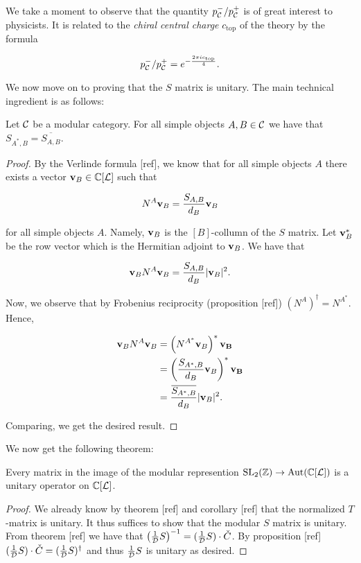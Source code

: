 We take a moment to observe that the quantity $p_{{\mathcal C}}^-/p_{{\mathcal C}}^+$ is of great interest to physicists. It is related to the {\em chiral central charge} $c_{\text{top}}$ of the theory by the formula

$$p_{{\mathcal C}}^-/p_{{\mathcal C}}^{+}=e^{-\frac{2\pi i c_{\text{top}}}{4}}.$$


We now move on to proving that the $S$ matrix is unitary. The main technical ingredient is as follows:

\begin{prop} Let ${\mathcal C}$ be a modular category. For all simple objects $A,B\in {\mathcal C}$ we have that $S_{A^*,B}=\overline{S_{A,B}}$.
\end{prop}
\begin{proof} By the Verlinde formula [ref], we know that for all simple objects $A$ there exists a vector $\bold{v}_B\in {\mathbb C}[{\mathcal L}]$ such that

$$N^{A} \bold{v}_B= \frac{S_{A,B}}{d_B}\bold{v}_B$$

for all simple objects $A$. Namely, $\bold{v}_B$ is the $[B]$-collumn of the $S$ matrix. Let $\bold{v}_B^{*}$ be the row vector which is the Hermitian adjoint to $\bold{v}_B$. We have that

$$\bold{v}_{B}N^{A}\bold{v}_B=\frac{S_{A,B}}{d_B}|\bold{v}_B|^2.$$

Now, we observe that by Frobenius reciprocity (proposition [ref]) $(N^{A})^{\dagger}=N^{A^*}$. Hence,

\begin{align*}
\bold{v}_{B}N^{A}\bold{v}_B&=\left(N^{A^*}\bold{v}_B\right)^*\bold{v_B}\\
&=\left(\frac{S_{A^*,B}}{d_B}\bold{v}_B\right)^*\bold{v_B}\\
&=\frac{\overline{S_{A^*,B}}}{d_B}|\bold{v}_B|^2.
\end{align*}

Comparing, we get the desired result.

\end{proof}

We now get the following theorem:

\begin{thrm} Every matrix in the image of the modular represention $\operatorname{SL}_2({\mathbb Z})\to \operatorname{Aut}({\mathbb C}[{\mathcal L}])$ is a unitary operator on ${\mathbb C}[{\mathcal L}]$.
\end{thrm}
\begin{proof} We already know by theorem [ref] and corollary [ref] that the normalized $T$-matrix is unitary. It thus suffices to show that the modular $S$ matrix is unitary. From theorem [ref] we have that $\left(\frac{1}{{\mathcal D}}S\right)^{-1} = (\frac{1}{{\mathcal D}}S) \cdot {\check C}$. By proposition [ref] $(\frac{1}{{\mathcal D}}S) \cdot {\check C} = (\frac{1}{{\mathcal D}}S)^{\dagger}$ and thus $\frac{1}{{\mathcal D}}S$ is unitary as desired.
\end{proof}

